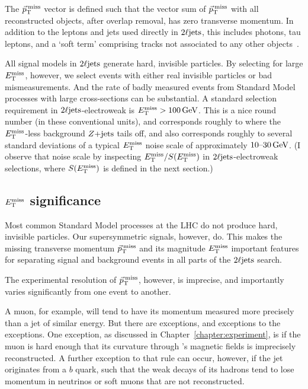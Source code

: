 The $\ptmiss$ vector is defined such that the vector sum of $\ptmiss$ with
all reconstructed objects, after overlap removal, has zero transverse momentum.
In addition to the leptons and jets used directly in $\twoljets$, this includes
photons, tau leptons, and a `soft term' comprising tracks not associated to
any other objects~\cite{atlas_met}.

All signal models in $\twoljets$ generate hard, invisible particles.
By selecting for large $\met$, however, we select events with either
real invisible particles or bad mismeasurements.
And the rate of badly measured events from Standard Model processes with large
cross-sections can be substantial.
A standard selection requirement in $\twoljets$-electroweak is
$\met > 100\,\eV[G]$.
This is a nice round number (in these conventional units), and corresponds
roughly to where the $\met$-less background $\zjets$ tails off,
and also corresponds roughly to several standard deviations of
a typical $\met$ noise scale of approximately $10\textrm{--}30\,\eV[G]$.
(I observe that noise scale by inspecting $\met / \metsig$ in
$\twoljets$-electroweak selections, where $\metsig$ is defined in the next
section.)


\subsection{\texorpdfstring{$\met$}{ETmiss} significance}
\label{sec:2ljets_metsig}
Most common Standard Model processes at the LHC do not produce hard,
invisible particles.
Our supersymmetric signals, however, do.
This makes the missing transverse momentum $\ptmiss$ and its magnitude $\met$
important features for separating signal and background events in all parts
of the $\twoljets$ search.

The experimental resolution of $\ptmiss$, however, is imprecise, and
importantly varies significantly from one event to another.

A muon, for example, will tend to have its momentum measured more precisely
than a jet of similar energy.
But there are exceptions, and exceptions to the exceptions.
One exception, as discussed in Chapter~\ref{chapter:experiment}, is if the muon
is hard enough that its curvature through \atlas's magnetic fields is
imprecisely reconstructed.
A further exception to that rule can occur, however, if the jet originates from a
$b$ quark, such that the weak decays of its hadrons tend to lose momentum in
neutrinos or soft muons that are not reconstructed.

